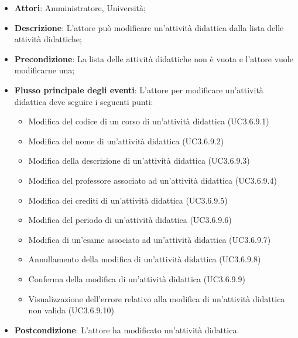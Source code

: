 \begin{itemize}
\item \textbf{Attori}: Amministratore, Università;
\item \textbf{Descrizione}: L'attore può modificare un’attività didattica dalla lista delle attività didattiche;

\item \textbf{Precondizione}: La lista delle attività didattiche non è vuota e l'attore vuole modificarne una;

\item \textbf{Flusso principale degli eventi}: L'attore per modificare un’attività didattica deve seguire i seguenti punti:

\begin{itemize}
\item Modifica del codice di un corso di un'attività didattica (UC3.6.9.1)
\item Modifica del nome di un'attività didattica (UC3.6.9.2)
\item Modifica della descrizione di un'attività didattica (UC3.6.9.3)
\item Modifica del professore associato ad un'attività didattica (UC3.6.9.4)
\item Modifica dei crediti di un'attività didattica (UC3.6.9.5)
\item Modifica del periodo di un'attività didattica (UC3.6.9.6)
\item Modifica di un'esame associato ad un'attività didattica (UC3.6.9.7)
\item Annullamento della modifica di un'attività didattica (UC3.6.9.8)
\item Conferma della modifica di un'attività didattica (UC3.6.9.9)
\item Visualizzazione dell'errore relativo alla modifica di un’attività didattica non valida (UC3.6.9.10)
\end{itemize}
\item \textbf{Postcondizione}: L'attore ha modificato un’attività didattica.

\end{itemize}
